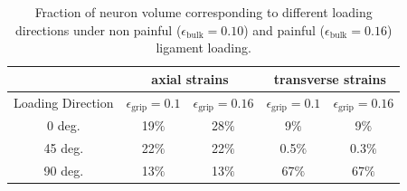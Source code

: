 \documentclass[]{interact}
\begin{document}
\begin{table}[ht]
\begin{center}
\begin{tabular}{ c c c c c }
\hline\hline
& \multicolumn{2}{c}{axial strains} & \multicolumn{2}{c}{transverse strains} \\ \hline 
Loading Direction & $\epsilon_{\text{grip}}=0.1$ & $\epsilon_{\text{grip}}=0.16$ & $\epsilon_{\text{grip}}=0.1$ & $\epsilon_{\text{grip}}=0.16$ \\
\hline 
0 deg. & 19$\%$ & 28$\%$ & 9$\%$ & 9$\%$\\ 
45 deg. & 22$\%$ & 22$\%$ & 0.5$\%$ & 0.3$\%$\\
90 deg. & 13$\%$ & 13$\%$ & 67$\%$ & 67$\%$\\ \hline \hline
\end{tabular}
\end{center}
\caption{Fraction of neuron volume corresponding to different loading directions under non painful ($\epsilon_{\text{bulk}}=0.10$) and painful ($\epsilon_{\text{bulk}}=0.16$) ligament loading.}
\label{table:ccdf_volfrac_compare}
\end{table}
\end{document}
